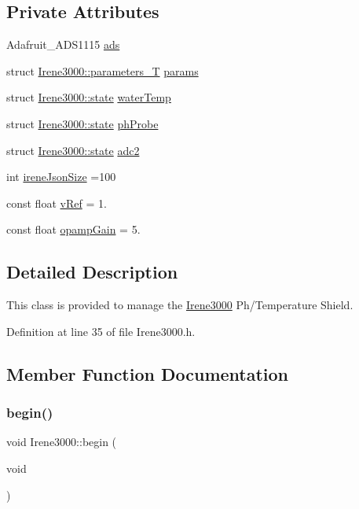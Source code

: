 \subsection*{Private Attributes}
\begin{DoxyCompactItemize}
\item 
Adafruit\+\_\+\+A\+D\+S1115 \hyperlink{classIrene3000_a1215e77ba761c9908d80d691f149e135}{ads}
\item 
struct \hyperlink{structIrene3000_1_1parameters__T}{Irene3000\+::parameters\+\_\+T} \hyperlink{classIrene3000_a136585a5ee7f9ac6ab52175fa153f8e3}{params}
\item 
struct \hyperlink{structIrene3000_1_1state}{Irene3000\+::state} \hyperlink{classIrene3000_af05612c78c758ce9db316c75ad937130}{water\+Temp}
\item 
struct \hyperlink{structIrene3000_1_1state}{Irene3000\+::state} \hyperlink{classIrene3000_a997a4ee466fa1d5416e07e444965dc9e}{ph\+Probe}
\item 
struct \hyperlink{structIrene3000_1_1state}{Irene3000\+::state} \hyperlink{classIrene3000_aae3a95a1c83c766cd2f299ce471c337e}{adc2}
\item 
int \hyperlink{classIrene3000_a6534710e4c81669dcc828d2c5450fabe}{irene\+Json\+Size} =100
\item 
const float \hyperlink{classIrene3000_a018e7ff9bee57e6d2b298667a668ba7e}{v\+Ref} = 1.
\item 
const float \hyperlink{classIrene3000_a4e588985ca74e5076029d5dee81034f2}{opamp\+Gain} = 5.
\end{DoxyCompactItemize}


\subsection{Detailed Description}
This class is provided to manage the \hyperlink{classIrene3000}{Irene3000} Ph/\+Temperature Shield. 

Definition at line 35 of file Irene3000.\+h.



\subsection{Member Function Documentation}
\mbox{\label{classIrene3000_ad5891806c500ae1007afe52b9e304c2b}} 
\subsubsection{\texorpdfstring{begin()}{begin()}}
{\footnotesize\ttfamily void Irene3000\+::begin (\begin{DoxyParamCaption}\item[{void}]{ }\end{DoxyParamCaption})}

